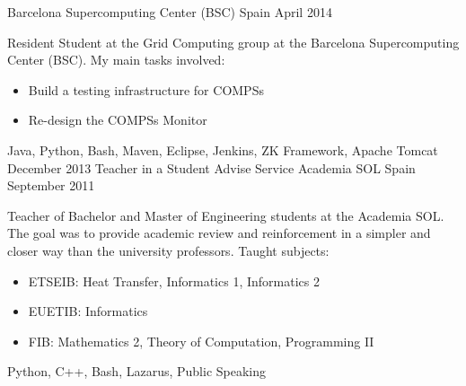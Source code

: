 \begin{experiences}
        {Barcelona Supercomputing Center (BSC)}
        {Spain}
        {April 2014}
        {Resident Student at the Grid Computing group at the Barcelona Supercomputing Center (BSC). My main tasks involved:
        \begin{itemize}
            \item Build a testing infrastructure for COMPSs
            \item Re-design the COMPSs Monitor
        \end{itemize}
        }
        {Java, Python, Bash, Maven, Eclipse, Jenkins, ZK Framework, Apache Tomcat}
    \emptySeparator
    \experience
        {December 2013}
        {Teacher in a Student Advise Service}
        {Academia SOL}
        {Spain}
        {September 2011}
        {Teacher of Bachelor and Master of Engineering students at the Academia SOL. The goal was to provide academic review and reinforcement in a simpler and closer way than the university professors. Taught subjects:
        \begin{itemize}
            \item ETSEIB: Heat Transfer, Informatics 1, Informatics 2
            \item EUETIB: Informatics
            \item FIB: Mathematics 2, Theory of Computation, Programming II
        \end{itemize}
        }
        {Python, C++, Bash, Lazarus, Public Speaking}

\end{experiences}
